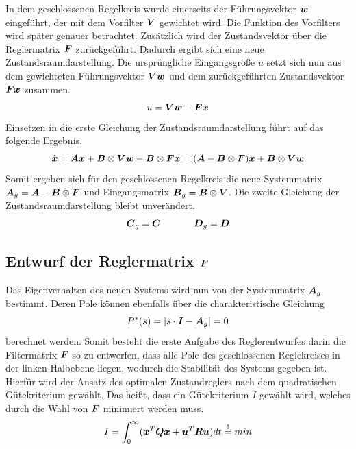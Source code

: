 In dem geschlossenen Regelkreis wurde einerseits der Führungsvektor $\boldsymbol{w}$ eingeführt, der mit dem Vorfilter $\boldsymbol{V}$ gewichtet wird. Die Funktion des Vorfilters wird später genauer betrachtet. Zusätzlich wird der Zustandsvektor über die Reglermatrix $\boldsymbol{F}$ zurückgeführt. Dadurch ergibt sich eine neue Zustandsraumdarstellung.
Die ursprüngliche Eingangsgröße $u$ setzt sich nun aus dem gewichteten Führungsvektor $\boldsymbol{V}\boldsymbol{w}$ und dem zurückgeführten Zustandsvektor $\boldsymbol{F}\boldsymbol{x}$ zusammen.
\begin{equation}
u = \boldsymbol{V}\boldsymbol{w}-\boldsymbol{F}\boldsymbol{x}
\end{equation}
Einsetzen in die erste Gleichung der Zustandsraumdarstellung führt auf das folgende Ergebnis.
\begin{equation}
\dot{\boldsymbol{x}} = \boldsymbol{A}\boldsymbol{x}+\boldsymbol{B}\otimes\boldsymbol{V}\boldsymbol{w} - \boldsymbol{B}\otimes\boldsymbol{F}\boldsymbol{x} = (\boldsymbol{A}-\boldsymbol{B}\otimes\boldsymbol{F})\boldsymbol{x}+\boldsymbol{B}\otimes\boldsymbol{V}\boldsymbol{w}
\end{equation}
Somit ergeben sich für den geschlossenen Regelkreis die neue Systemmatrix $\boldsymbol{A}_g=\boldsymbol{A}-\boldsymbol{B}\otimes\boldsymbol{F}$ und Eingangsmatrix $\boldsymbol{B}_g=\boldsymbol{B}\otimes\boldsymbol{V}$. Die zweite Gleichung der Zustandsraumdarstellung bleibt unverändert.
\begin{equation}
\boldsymbol{C}_g = \boldsymbol{C} \hspace{35pt} \boldsymbol{D}_g=\boldsymbol{D}
\end{equation}

\subsection{Entwurf der Reglermatrix $\boldsymbol{F}$}
Das Eigenverhalten des neuen Systems wird nun von der Systemmatrix $\boldsymbol{A}_g$ bestimmt. Deren Pole können ebenfalls über die charakteristische Gleichung
\begin{equation}
P^*(s) = |s\cdot\boldsymbol{I}-\boldsymbol{A}_g| = 0
\end{equation}
berechnet werden. Somit besteht die erste Aufgabe des Reglerentwurfes darin die Filtermatrix $\boldsymbol{F}$ so zu entwerfen, dass alle Pole des geschlossenen Reglekreises in der linken Halbebene liegen, wodurch die Stabilität des Systems gegeben ist. Hierfür wird der Ansatz des optimalen Zustandreglers nach dem quadratischen Gütekriterium gewählt. Das heißt, dass ein Gütekriterium $I$ gewählt wird, welches durch die Wahl von $\boldsymbol{F}$ minimiert werden muss.
\begin{equation}
I = \int^{\infty}_0 (\boldsymbol{x}^T\boldsymbol{Q}\boldsymbol{x}+\boldsymbol{u}^T\boldsymbol{R}\boldsymbol{u})dt \overset{!}{=}min
\end{equation}

